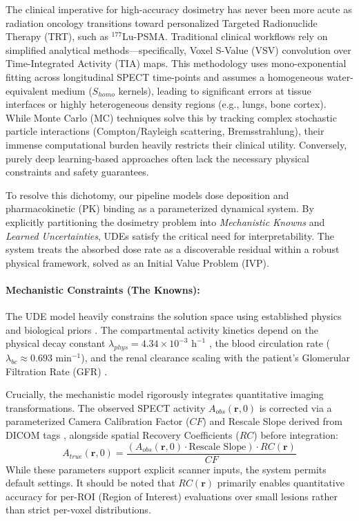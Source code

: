 \documentclass[10pt,letterpaper]{article}
\begin{document}
The clinical imperative for high-accuracy dosimetry has never been more acute as radiation oncology transitions toward personalized Targeted Radionuclide Therapy (TRT), such as $^{177}$Lu-PSMA. Traditional clinical workflows rely on simplified analytical methods---specifically, Voxel S-Value (VSV) convolution over Time-Integrated Activity (TIA) maps. This methodology uses mono-exponential fitting across longitudinal SPECT time-points and assumes a homogeneous water-equivalent medium ($S_{homo}$ kernels), leading to significant errors at tissue interfaces or highly heterogeneous density regions (e.g., lungs, bone cortex). While Monte Carlo (MC) techniques solve this by tracking complex stochastic particle interactions (Compton/Rayleigh scattering, Bremsstrahlung), their immense computational burden heavily restricts their clinical utility. Conversely, purely deep learning-based approaches often lack the necessary physical constraints and safety guarantees.

To resolve this dichotomy, our pipeline models dose deposition and pharmacokinetic (PK) binding as a parameterized dynamical system. By explicitly partitioning the dosimetry problem into \textit{Mechanistic Knowns} and \textit{Learned Uncertainties}, UDEs satisfy the critical need for interpretability. The system treats the absorbed dose rate as a discoverable residual within a robust physical framework, solved as an Initial Value Problem (IVP).

\paragraph{Mechanistic Constraints (The Knowns):}
The UDE model heavily constrains the solution space using established physics and biological priors \cite{KennedyLugassi2020}. The compartmental activity kinetics depend on the physical decay constant $\lambda_{phys} = 4.34 \times 10^{-3} \text{ h}^{-1}$ \cite{ReschFouladgar2023, StabinMadsen2019}, the blood circulation rate ($\lambda_{bc} \approx 0.693 \text{ min}^{-1}$), and the renal clearance scaling with the patient's Glomerular Filtration Rate (GFR) \cite{HardiansyahYousefzadehNowshahr2024}.

Crucially, the mechanistic model rigorously integrates quantitative imaging transformations. The observed SPECT activity $A_{obs}(\mathbf{r}, 0)$ is corrected via a parameterized Camera Calibration Factor ($CF$) and Rescale Slope derived from DICOM tags \cite{BidgoodHorii1992, GleisnerChouin2022}, alongside spatial Recovery Coefficients ($RC$) \cite{KlettingSchimmel2015} before integration:
\begin{equation}
    A_{true}(\mathbf{r}, 0) = \frac{(A_{obs}(\mathbf{r}, 0) \cdot \text{Rescale Slope}) \cdot RC(\mathbf{r})}{CF}
\end{equation}
While these parameters support explicit scanner inputs, the system permits default settings. It should be noted that $RC(\mathbf{r})$ primarily enables quantitative accuracy for per-ROI (Region of Interest) evaluations over small lesions rather than strict per-voxel distributions.
\end{document}
